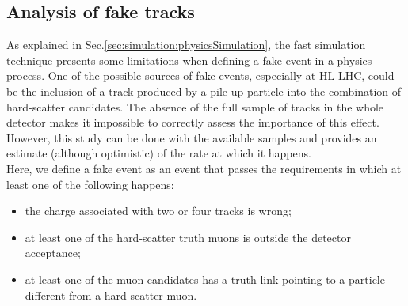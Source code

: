 \documentclass[a4paper,twoside,12pt]{book}
\begin{document}
\begin{table} [h]
	\caption{Comparison between the $4\mu$ mass resolutions with or without
	the photon selection applied during the generation stage. Values are expressed
	in GeV.}
	\label{tab:massResolutionWithPhotons}
\end{table}

\subsection*{Analysis of fake tracks}
As explained in Sec.\ref{sec:simulation:physicsSimulation}, the fast simulation technique 
presents some limitations when defining a fake event in a physics process. One of the
possible sources of fake events, especially at HL-LHC, could be the inclusion of a 
track produced by a pile-up particle into the combination of hard-scatter candidates.
The absence of the full sample of tracks in the whole detector makes it impossible
to correctly assess the importance of this effect. However, this study can be done with the 
available samples and provides an estimate (although optimistic) of the rate at which it happens.\\

Here, we define a fake event as an event that passes the requirements in which at least one of 
the following happens:\\
\begin{itemize}
\item the charge associated with two or four tracks is wrong;
\item at least one of the hard-scatter truth muons is outside the detector acceptance;
\item at least one of the muon candidates has a truth link pointing to a particle different
from a hard-scatter muon.
\end{itemize}
\end{document}
